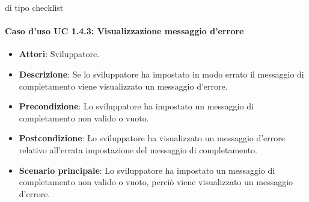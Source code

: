di tipo checklist\paragraph{Caso d'uso UC 1.4.3: Visualizzazione messaggio d'errore}

\FloatBarrier
\begin{itemize}
\item\textbf{Attori}: Sviluppatore.
\item\textbf{Descrizione}: Se lo sviluppatore ha impostato in modo errato il messaggio di completamento viene visualizzato un messaggio d'errore.
\item\textbf{Precondizione}: Lo sviluppatore ha impostato un messaggio di completamento non valido o vuoto.
\item\textbf{Postcondizione}: Lo sviluppatore ha visualizzato un messaggio d'errore relativo all'errata impostazione del messaggio di completamento.
\item\textbf{Scenario principale}: Lo sviluppatore ha impostato un messaggio di completamento non valido o vuoto, perciò viene visualizzato un messaggio d'errore.
\end{itemize}
